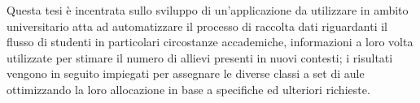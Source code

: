 \abstract
Questa tesi è incentrata sullo sviluppo di un'applicazione da utilizzare in ambito universitario 
atta ad automatizzare il processo di raccolta dati riguardanti il flusso di studenti in particolari 
circostanze accademiche, informazioni a loro volta utilizzate per stimare il numero di allievi presenti in 
nuovi contesti; i risultati vengono in seguito impiegati per assegnare le diverse classi a set di aule 
ottimizzando la loro allocazione in base a specifiche ed ulteriori richieste.